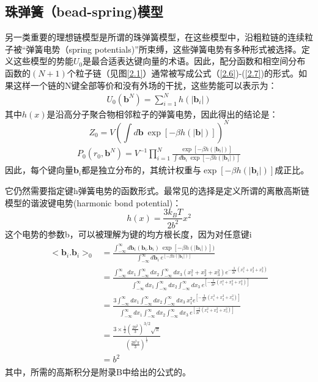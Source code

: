 \subsection{珠弹簧（bead-spring)模型}
另一类重要的理想链模型是所谓的珠弹簧模型，在这些模型中，沿粗粒链的连续粒子被“弹簧电势（spring potentials)”所束缚，这些弹簧电势有多种形式被选择。定义这些模型的势能$U_{0}$是最合适表达键向量的术语。因此，配分函数和相空间分布函数的$(N+1)$个粒子链（见图\ref{2.1}）通常被写成公式（\ref{2.6})-(\ref{2.7})的形式。如果这样一个链的N键全部等价和没有外场的干扰，这些势能可以表示为：
\begin{equation}\label{2.26}
\begin{split}
U_{0}(\mathbf{b}^{N})= \sum_{i=1}^{N}h(|\mathbf{b}_{i}|)
\end{split}
\end{equation}
其中$h(x)$是沿高分子聚合物相邻粒子的弹簧电势，因此得出的结论是：
\begin{equation}\label{2.27}
Z_{0}=V(\int d\mathbf{b}~\exp[-\beta h(|\mathbf{b}|)])^N 
\end{equation}
\begin{equation}\label{2.28}
\begin{split}		
P_{0} (r_{0},\mathbf{b}^N) =V^{-1} \prod_{i=1}^{N} \frac{\exp[-\beta h(|\mathbf{b}_{i}|)]}{\int d \mathbf{b}_{i}~\exp[-\beta h(|\mathbf{b}_{i}|)]}
\end{split}
\end{equation}
因此，每个键向量$\mathbf{b}_{i}$都是独立分布的，其统计权重与$\exp[-\beta h(|\mathbf{b}_{i}|)]$成正比。 

它仍然需要指定键h弹簧电势的函数形式。最常见的选择是定义所谓的离散高斯链模型的谐波键电势(harmonic bond potential)： 
\begin{equation}\label{2.29}
h(x)=\frac{3k_{B}T}{2b^2} x^2  
\end{equation}
这个电势的参数b，可以被理解为键的均方根长度，因为对任意键i 
\begin{align}\label{2.30}
\begin{split}
<\mathbf{b}_{i}.\mathbf{b}_{i}>_{0}&= \frac{\int_{-\infty}^{\infty} d\mathbf{b}_{i}(\mathbf{b}_{i}.\mathbf{b}_{i})~\exp[-\beta h(|\mathbf{b}_{i}|)])}{\int_{-\infty}^{\infty} d\mathbf{b}_{i}~e^[-\beta h(|\mathbf{b}_{i}|)]}\\ &=\frac{\int_{-\infty}^{\infty}dx_1\int_{-\infty}^{\infty}dx_2\int_{-\infty}^{\infty}dx_3(x_1^2+x_2^2+x_3^2)e^{-\frac{3}{2b^2}(x_1^2+x_2^2+x_3^2)}}{\int_{-\infty}^{\infty}dx_1\int_{-\infty}^{\infty}dx_2\int_{-\infty}^{\infty}dx_3~e^[-\frac{3}{2b^2}(x_1^2+x_2^2+x_3^2)]}\\ &=\frac{3\int_{-\infty}^{\infty}dx_1\int_{-\infty}^{\infty}dx_2\int_{-\infty}^{\infty}dx_3~x_1^2e^[-\frac{3}{2b^2}(x_1^2+x_2^2+x_3^2)]}{\int_{-\infty}^{\infty}dx_1\int_{-\infty}^{\infty}dx_2\int_{-\infty}^{\infty}dx_3~e^[\frac{-3}{2b^2}(x_1^2+x_2^2+x_3^2)]}\\ &=\frac{3 \times\frac{1}{2} (\frac{2b^2}{3})^{3/2}\sqrt{\pi}}{(\frac{2b^2\pi}{3})^{\frac{1}{2}}}\\ &=b^2
\end{split}
\end{align}
其中，所需的高斯积分是附录B中给出的公式的。

